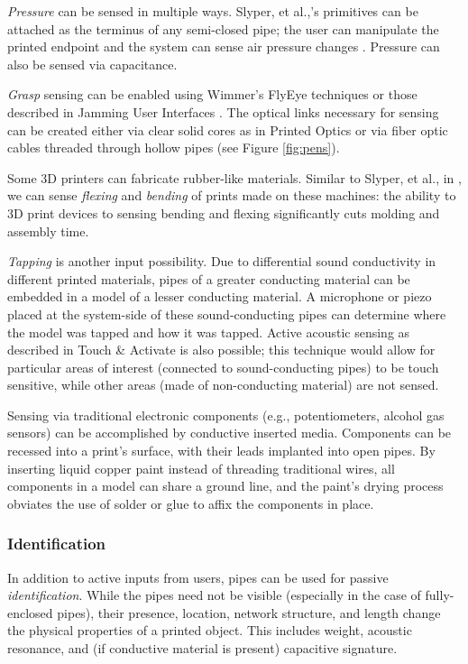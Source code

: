 \emph{Pressure} can be sensed in multiple ways.  Slyper, et al.,'s primitives can be attached as the terminus of any semi-closed pipe; the user can manipulate the printed endpoint and the system can sense air pressure changes \cite{Slyper-pressure}.  Pressure can also be sensed via capacitance.

\emph{Grasp} sensing can be enabled using Wimmer's FlyEye techniques \cite{Wimmer-flyeye} or those described in Jamming User Interfaces \cite{Follmer-jamming}.  The optical links necessary for sensing can be created either via clear solid cores as in Printed Optics \cite{Willis-printedoptics} or via fiber optic cables threaded through hollow pipes (see Figure \ref{fig:pens}).

Some 3D printers can fabricate rubber-like materials.  Similar to Slyper, et al., in \cite{Slyper-shape}, we can sense \emph{flexing} and \emph{bending} of prints made on these machines: the ability to 3D print devices to sensing bending and flexing significantly cuts molding and assembly time.

\emph{Tapping} is another input possibility.  Due to differential sound conductivity in different printed materials, pipes of a greater conducting material can be embedded in a model of a lesser conducting material.  A microphone or piezo placed at the system-side of these sound-conducting pipes can determine where the model was tapped and how it was tapped.  Active acoustic sensing as described in Touch \& Activate \cite{Ono-touchandactivate} is also possible; this technique would allow for particular areas of interest (connected to sound-conducting pipes) to be touch sensitive, while other areas (made of non-conducting material) are not sensed.

Sensing via traditional electronic components (e.g., potentiometers, alcohol gas sensors) can be accomplished by conductive inserted media.  Components can be recessed into a print's surface, with their leads implanted into open pipes.  By inserting liquid copper paint instead of threading traditional wires, all components in a model can share a ground line, and the paint's drying process obviates the use of solder or glue to affix the components in place.

\subsubsection{Identification}
In addition to active inputs from users, pipes can be used for passive \emph{identification}.  While the pipes need not be visible (especially in the case of fully-enclosed pipes), their presence, location, network structure, and length change the physical properties of a printed object.  This includes weight, acoustic resonance, and (if conductive material is present) capacitive signature.

